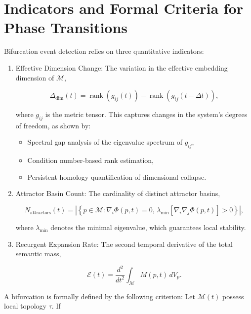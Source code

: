 \section{Indicators and Formal Criteria for Phase Transitions}

Bifurcation event detection relies on three quantitative indicators:

\begin{enumerate}
    \item Effective Dimension Change: The variation in the effective embedding dimension of \(\mathcal{M}\),

    \begin{equation}
    \Delta_{\text{dim}}(t) = \operatorname{rank}(g_{ij}(t)) - \operatorname{rank}(g_{ij}(t-\Delta t)),
    \end{equation}

    where \(g_{ij}\) is the metric tensor. This captures changes in the system's degrees of freedom, as shown by:
    \begin{itemize}
        \item Spectral gap analysis of the eigenvalue spectrum of \(g_{ij}\),
        \item Condition number-based rank estimation,
        \item Persistent homology quantification of dimensional collapse.
    \end{itemize}

    \item Attractor Basin Count: The cardinality of distinct attractor basins,

    \begin{equation}
    N_{\text{attractors}}(t) = \left|\left\{p \in \mathcal{M} : \nabla_i \Phi(p,t) = 0,\, \lambda_{\min}[\nabla_i \nabla_j \Phi(p,t)] > 0\right\}\right|,
    \end{equation}

    where \(\lambda_{\min}\) denotes the minimal eigenvalue, which guarantees local stability.

    \item Recurgent Expansion Rate: The second temporal derivative of the total semantic mass,

    \begin{equation}
    \mathcal{E}(t) = \frac{d^2}{dt^2}\int_{\mathcal{M}} M(p,t) \, dV_p.
    \end{equation}
\end{enumerate}

A bifurcation is formally defined by the following criterion: Let \(\mathcal{M}(t)\) possess local topology \(\tau\). If

